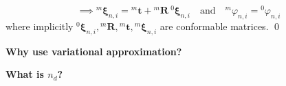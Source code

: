 \begin{equation}
    \implies
    {}^{m}\boldsymbol{\xi}_{n, i}
    =
    {}^{m}\boldsymbol{t} + {}^{m}\boldsymbol{R} \ {}^{0}\boldsymbol{\xi}_{n, i}
    \quad \text{and} \quad
    \boxed{
    {}^{m}\varphi_{n, i}
                =
                {}^{0}\varphi_{n, i}
        }
\end{equation}
where implicitly \( {}^{0}\boldsymbol{\xi}_{n, i}, {}^{m}\boldsymbol{R}, {}^{m}\boldsymbol{t}, {}^{m}\boldsymbol{\xi}_{n, i} \) are conformable matrices.
\qed{}

\vspace{1em}
\textbf{Why use variational approximation?}

\vspace{1em}
\textbf{What is \( n_d \)?}
